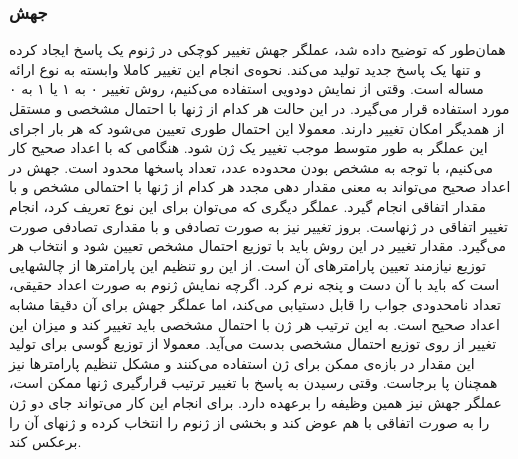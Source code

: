 \documentclass{report}
\begin{document}
\subsubsection{جهش}
همان‌طور که توضیح داده شد، عملگر جهش تغییر کوچکی در ژنوم یک پاسخ ایجاد کرده و تنها یک پاسخ جدید تولید می‌کند. نحوه‌ی انجام این تغییر کاملا وابسته به نوع ارائه مساله است. وقتی از نمایش دودویی استفاده می‌کنیم، روش تغییر ۰ به ۱ یا ۱ به ۰ مورد استفاده قرار می‌گیرد. در این حالت هر کدام از ژنها با احتمال مشخصی و مستقل از همدیگر امکان تغییر دارند. معمولا این احتمال طوری تعیین می‌شود که هر بار اجرای این عملگر به طور متوسط موجب تغییر یک ژن شود.
هنگامی که با اعداد صحیح کار می‌کنیم، با توجه به مشخص بودن محدوده عدد، تعداد پاسخها محدود است. جهش در اعداد صحیح می‌تواند به معنی مقدار دهی مجدد هر کدام از ژنها با احتمالی مشخص و با مقدار اتفاقی انجام گیرد. عملگر دیگری که می‌توان برای این نوع تعریف کرد، انجام تغییر اتفاقی در ژنهاست. بروز تغییر نیز به صورت تصادفی و با مقداری تصادفی صورت می‌گیرد. مقدار تغییر در این روش باید با توزیع احتمال مشخص تعیین شود و انتخاب هر توزیع نیازمند تعیین پارامترهای آن است. از این رو تنظیم این پارامترها از چالشهایی است که باید با آن دست و پنجه نرم کرد.
اگرچه نمایش ژنوم به صورت اعداد حقیقی، تعداد نامحدودی جواب را قابل دستیابی می‌کند، اما عملگر جهش برای آن دقیقا مشابه اعداد صحیح است. به این ترتیب هر ژن با احتمال مشخصی باید تغییر کند و میزان این تغییر از روی توزیع احتمال مشخصی بدست می‌آید. معمولا از توزیع گوسی برای تولید این مقدار در بازه‌ی ممکن برای ژن استفاده می‌کنند و مشکل تنظیم پارامترها نیز همچنان پا برجاست.
وقتی رسیدن به پاسخ با تغییر ترتیب قرارگیری ژنها ممکن است، عملگر جهش نیز همین وظیفه را برعهده دارد. برای انجام این کار می‌تواند جای دو ژن را به صورت اتفاقی با هم عوض کند و بخشی از ژنوم را انتخاب کرده و ژنهای آن را برعکس کند.
\end{document}
